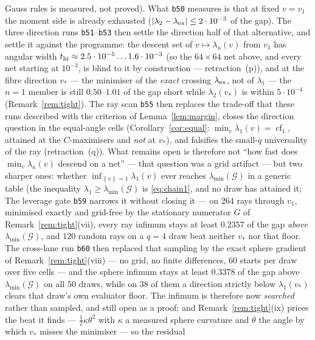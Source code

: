 \documentclass[11pt]{article}
\theoremstyle{remark}
\newcommand{\Gr}{\mathcal{G}}
\begin{document}
\begin{enumerate}
Gauss rules is measured, not proved). What
\texttt{b50} measures is that at
fixed $v=v_1$ the moment side is already exhausted ($|\lambda_2-\lambda_{\rm ex}|\le2\cdot10^{-3}$ of
the gap). The three direction runs \texttt{b51}--\texttt{b53} then settle the direction half of that alternative, and settle it
against the programme: the descent set of $v\mapsto\lambda_n(v)$ from $v_1$ has angular width
$t_{\rm hi}\approx2.5\cdot10^{-5}\ldots1.6\cdot10^{-3}$ (so the $64\times64$ net above, and every net
starting at $10^{-3}$, is blind to it by construction --- retraction~(p)), and at the fibre direction
$v_\ast$ --- the minimiser of the \emph{exact} crossing $\lambda_{\rm ex}$, not of $\lambda_1$ ---
the $n=1$ member is still $0.50$--$1.01$ of the gap short while $\lambda_2(v_\ast)$ is within
$5\cdot10^{-4}$ (Remark~\ref{rem:tight}). The ray scan \texttt{b55} then replaces the trade-off that these runs
described with the criterion of Lemma~\ref{lem:margin}, closes the direction question in the
equal-angle cells (Corollary~\ref{cor:equal}: $\min_v\lambda_1(v)=\operatorname{cf}_1$, attained at the
$C$-maximisers and \emph{not} at $v_\ast$), and falsifies the small-$q$ universality of the ray
(retraction~(q)). What remains open is therefore not ``how fast does
$\min_v\lambda_n(v)$ descend on a net'' --- that question was a grid artifact --- but two sharper ones:
whether $\inf_{\|v\|=1}\lambda_1(v)$ ever reaches $\lambda_{\min}(\Gr)$ in a generic table (the
inequality $\lambda_1\ge\lambda_{\min}(\Gr)$ is \eqref{eq:chain1}, and no draw has attained it;
The leverage gate \texttt{b59} narrows it without closing it --- on $264$ rays through $v_1$, minimised exactly and
grid-free by the stationary numerator $G$ of Remark~\ref{rem:tight}(vii), every ray infimum stays at
least $0.2357$ of the gap \emph{above} $\lambda_{\min}(\Gr)$, and $120$ random rays on a $q=4$ draw beat
neither $v_\ast$ nor that floor. The cross-lane run \texttt{b60} then replaced that sampling by the exact sphere gradient of
Remark~\ref{rem:tight}(viii) --- no grid, no finite differences, $60$ starts per draw over five cells ---
and the sphere infimum stays at least $0.3378$ of the gap above $\lambda_{\min}(\Gr)$ on all $50$ draws,
while on $38$ of them a direction strictly below $\lambda_1(v_\ast)$ clears that draw's own evaluator
floor. The infimum is therefore now \emph{searched} rather than sampled, and still open as a proof; and
Remark~\ref{rem:tight}(ix) prices the beat it finds --- $\tfrac12\kappa\theta^2$ with $\kappa$ a measured
sphere curvature and $\theta$ the angle by which $v_\ast$ misses the minimiser --- so the residual

\end{enumerate}
\end{document}
